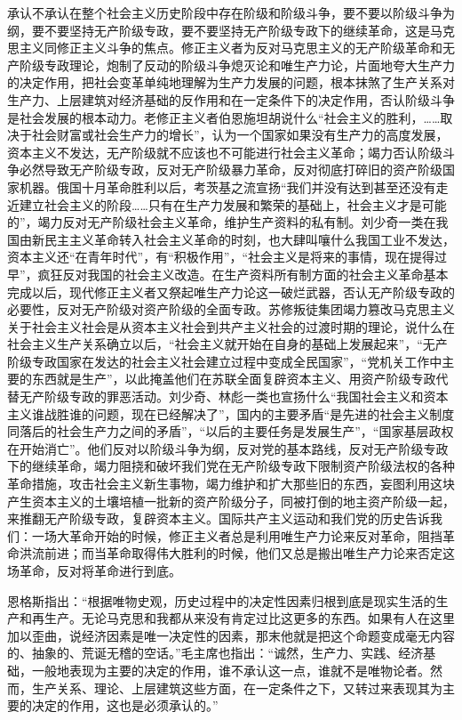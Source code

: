 \documentclass{book}
\begin{document}
承认不承认在整个社会主义历史阶段中存在阶级和阶级斗争，要不要以阶级斗争为纲，要不要坚持无产阶级专政，要不要坚持无产阶级专政下的继续革命，这是马克思主义同修正主义斗争的焦点。修正主义者为反对马克思主义的无产阶级革命和无产阶级专政理论，炮制了反动的阶级斗争熄灭论和唯生产力论，片面地夸大生产力的决定作用，把社会变革单纯地理解为生产力发展的问题，根本抹煞了生产关系对生产力、上层建筑对经济基础的反作用和在一定条件下的决定作用，否认阶级斗争是社会发展的根本动力。老修正主义者伯恩施坦胡说什么“社会主义的胜利，……取决于社会财富或社会生产力的增长”，认为一个国家如果没有生产力的高度发展，资本主义不发达，无产阶级就不应该也不可能进行社会主义革命；竭力否认阶级斗争必然导致无产阶级专政，反对无产阶级暴力革命，反对彻底打碎旧的资产阶级国家机器。俄国十月革命胜利以后，考茨基之流宣扬“我们并没有达到甚至还没有走近建立社会主义的阶段……只有在生产力发展和繁荣的基础上，社会主义才是可能的”，竭力反对无产阶级社会主义革命，维护生产资料的私有制。刘少奇一类在我国由新民主主义革命转入社会主义革命的时刻，也大肆叫嚷什么我国工业不发达，资本主义还“在青年时代”，有“积极作用”，“社会主义是将来的事情，现在提得过早”，疯狂反对我国的社会主义改造。在生产资料所有制方面的社会主义革命基本完成以后，现代修正主义者又祭起唯生产力论这一破烂武器，否认无产阶级专政的必要性，反对无产阶级对资产阶级的全面专政。苏修叛徒集团竭力篡改马克思主义关于社会主义社会是从资本主义社会到共产主义社会的过渡时期的理论，说什么在社会主义生产关系确立以后，“社会主义就开始在自身的基础上发展起来”，“无产阶级专政国家在发达的社会主义社会建立过程中变成全民国家”，“党机关工作中主要的东西就是生产”，以此掩盖他们在苏联全面复辟资本主义、用资产阶级专政代替无产阶级专政的罪恶活动。刘少奇、林彪一类也宣扬什么“我国社会主义和资本主义谁战胜谁的问题，现在已经解决了”，国内的主要矛盾“是先进的社会主义制度同落后的社会生产力之间的矛盾”，“以后的主要任务是发展生产”，“国家基层政权在开始消亡”。他们反对以阶级斗争为纲，反对党的基本路线，反对无产阶级专政下的继续革命，竭力阻挠和破坏我们党在无产阶级专政下限制资产阶级法权的各种革命措施，攻击社会主义新生事物，竭力维护和扩大那些旧的东西，妄图利用这块产生资本主义的土壤培植一批新的资产阶级分子，同被打倒的地主资产阶级一起，来推翻无产阶级专政，复辟资本主义。国际共产主义运动和我们党的历史告诉我们：一场大革命开始的时候，修正主义者总是利用唯生产力论来反对革命，阻挡革命洪流前进；而当革命取得伟大胜利的时候，他们又总是搬出唯生产力论来否定这场革命，反对将革命进行到底。

恩格斯指出：“根据唯物史观，历史过程中的决定性因素归根到底是现实生活的生产和再生产。无论马克思和我都从来没有肯定过比这更多的东西。如果有人在这里加以歪曲，说经济因素是唯一决定性的因素，那末他就是把这个命题变成毫无内容的、抽象的、荒诞无稽的空话。”毛主席也指出：“诚然，生产力、实践、经济基础，一般地表现为主要的决定的作用，谁不承认这一点，谁就不是唯物论者。然而，生产关系、理论、上层建筑这些方面，在一定条件之下，又转过来表现其为主要的决定的作用，这也是必须承认的。”
\end{document}
